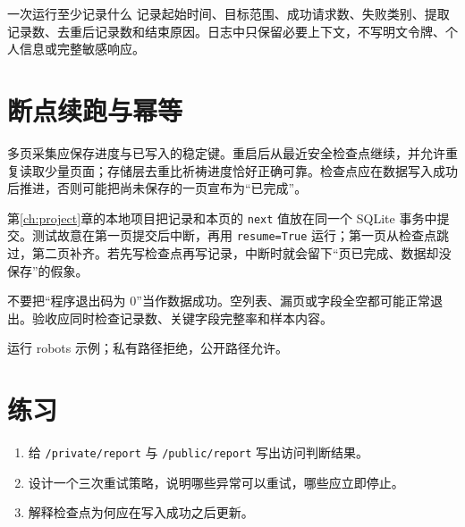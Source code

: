 \begin{method}{一次运行至少记录什么}
记录起始时间、目标范围、成功请求数、失败类别、提取记录数、去重后记录数和结束原因。日志中只保留必要上下文，不写明文令牌、个人信息或完整敏感响应。
\end{method}

\section{断点续跑与幂等}
多页采集应保存进度与已写入的稳定键。重启后从最近安全检查点继续，并允许重复读取少量页面；存储层去重比祈祷进度恰好正确可靠。检查点应在数据写入成功后推进，否则可能把尚未保存的一页宣布为“已完成”。

第\ref{ch:project}章的本地项目把记录和本页的 \texttt{next} 值放在同一个 SQLite 事务中提交。测试故意在第一页提交后中断，再用 \texttt{resume=True} 运行；第一页从检查点跳过，第二页补齐。若先写检查点再写记录，中断时就会留下“页已完成、数据却没保存”的假象。

\begin{warning}
不要把“程序退出码为 0”当作数据成功。空列表、漏页或字段全空都可能正常退出。验收应同时检查记录数、关键字段完整率和样本内容。
\end{warning}

\begin{tcolorbox}[title=本章验收,colframe=Teal,colback=Teal!3]
运行 robots 示例；私有路径拒绝，公开路径允许。
\end{tcolorbox}

\section{练习}
\begin{enumerate}[label=\arabic*.]
\item 给 \texttt{/private/report} 与 \texttt{/public/report} 写出访问判断结果。
\item 设计一个三次重试策略，说明哪些异常可以重试，哪些应立即停止。
\item 解释检查点为何应在写入成功之后更新。
\end{enumerate}
